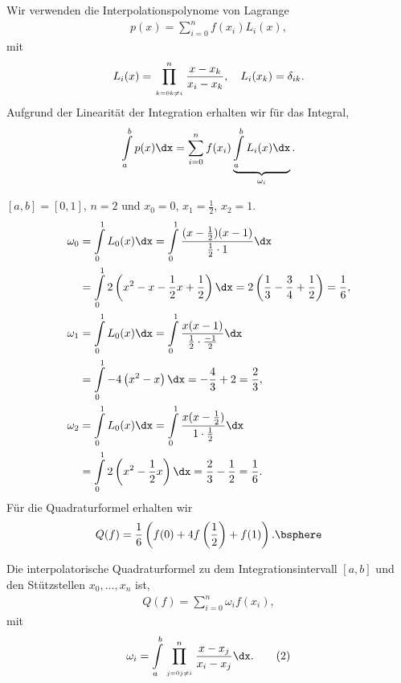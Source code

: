 Wir verwenden die Interpolationspolynome von Lagrange
\begin{align*}
p(x) = \sum\limits_{i=0}^n f(x_i)L_i(x),
\end{align*}
mit
\begin{align*}
L_i(x) = \prod\limits_{\atop{k=0}{k\neq i}}^n \frac{x-x_k}{x_i-x_k},\quad
L_i(x_k) = \delta_{ik}.
\end{align*}
Aufgrund der Linearität der Integration erhalten wir für das Integral,
\begin{align*}
\int\limits_a^b p(x)\dx = \sum\limits_{i=0}^n f(x_i)\underbrace{\int\limits_a^b
L_i(x)\dx}_{\omega_i}.
\end{align*}
\begin{bspn}
$[a,b]=[0,1]$, $n=2$ und $x_0=0$, $x_1=\frac{1}{2}$, $x_2=1$.
\begin{align*}
\omega_0 &= \int\limits_0^1 L_0(x)\dx
= \int\limits_0^1 \frac{(x-\frac{1}{2})(x-1)}{\frac{1}{2}\cdot 1}\dx\\
&= \int\limits_0^1 2\left( x^2 -x-\frac{1}{2}x+\frac{1}{2}\right)\dx
= 2\left(\frac{1}{3} - \frac{3}{4} + \frac{1}{2}\right)
= \frac{1}{6},\\
\omega_1 &= \int\limits_0^1 L_0(x)\dx
= \int\limits_0^1 \frac{x(x-1)}{\frac{1}{2}\cdot \frac{-1}{2}}\dx\\
&= \int\limits_0^1 -4\left( x^2-x\right)\dx
= -\frac{4}{3} + 2 = \frac{2}{3},\\
\omega_2 &= \int\limits_0^1 L_0(x)\dx
= \int\limits_0^1 \frac{x(x-\frac{1}{2})}{1\cdot \frac{1}{2}}\dx\\
&= \int\limits_0^1 2\left( x^2-\frac{1}{2}x\right)\dx
= \frac{2}{3} - \frac{1}{2} = \frac{1}{6}.
\end{align*}
Für die Quadraturformel erhalten wir
\begin{align*}
Q(f) = \frac{1}{6}\left(f(0)+4f\left(\frac{1}{2}\right) + f(1) \right).\bsphere
\end{align*}
\end{bspn}

\begin{bemn}[Ergebnis.]
Die interpolatorische Quadraturformel zu dem Integrationsintervall $[a,b]$ und 
den Stützstellen $x_0,\ldots,x_n$ ist,
\begin{align*}
Q(f) = \sum\limits_{i=0}^n \omega_i f(x_i),\tag{1}
\end{align*}
mit
\begin{align*}
\omega_i = \int\limits_a^b \prod\limits_{\atop{j=0}{j\neq i}}^n
\frac{x-x_j}{x_i-x_j}\dx.\tag{2}
\end{align*}
\end{bemn}

